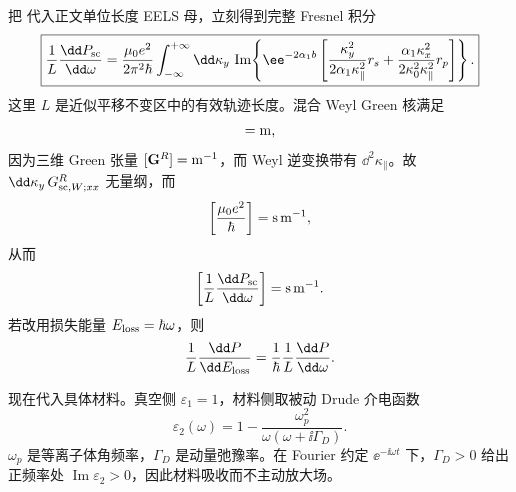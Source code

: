 \begin{exbox}
把 代入正文单位长度 EELS 母，立刻得到完整 Fresnel 积分
\begin{equation}
\boxed{
\frac1L\frac{\dd P_{\rm sc}}{\dd\omega}
=\frac{\mu_0e^2}{2\pi^2\hbar}
\int_{-\infty}^{+\infty}\dd\kappa_y\,
\operatorname{Im}\!\left\{
\ee^{-2\alpha_1 b}
\left[
\frac{\kappa_y^2}{2\alpha_1\kappa_\parallel^2}r_s
+\frac{\alpha_1\kappa_x^2}{2\kappa_0^2\kappa_\parallel^2}r_p
\right]\right\}.}
\label{eq:planar_aloof_eels_explicit_fresnel_integral}
\end{equation}
这里 $L$ 是近似平移不变区中的有效轨迹长度。混合 Weyl Green 核满足
\begin{equation*}
[\mathbf G_{{\rm sc},W}^R]={\rm m},
\end{equation*}
因为三维 Green 张量 $[\mathbf G^R]={\rm m^{-1}}$，而 Weyl 逆变换带有 $\dd^2 \kappa_\parallel$。故 $\dd\kappa_y\,G_{{\rm sc},W;xx}^R$ 无量纲，而
\begin{equation*}
\left[\frac{\mu_0e^2}{\hbar}\right]={\rm s\,m^{-1}},
\end{equation*}
从而
\begin{equation*}
\left[\frac1L\frac{\dd P_{\rm sc}}{\dd\omega}\right]
={\rm s\,m^{-1}}.
\end{equation*}
若改用损失能量 $E_{\rm loss}=\hbar\omega$，则
\begin{equation*}
\frac1L\frac{\dd P}{\dd E_{\rm loss}}
=\frac1\hbar\frac1L\frac{\dd P}{\dd\omega}.
\end{equation*}

现在代入具体材料。真空侧 $\varepsilon_1=1$，材料侧取被动 Drude 介电函数
\begin{equation}
\boxed{
\varepsilon_2(\omega)
=1-\frac{\omega_p^2}{\omega(\omega+\ii\Gamma_D)}.}
\label{eq:planar_drude_permittivity_example}
\end{equation}
$\omega_p$ 是等离子体角频率，$\Gamma_D$ 是动量弛豫率。在 Fourier 约定 $\ee^{-\ii\omega t}$ 下，$\Gamma_D>0$ 给出正频率处 $\operatorname{Im}\varepsilon_2>0$，因此材料吸收而不主动放大场。


\end{exbox}
